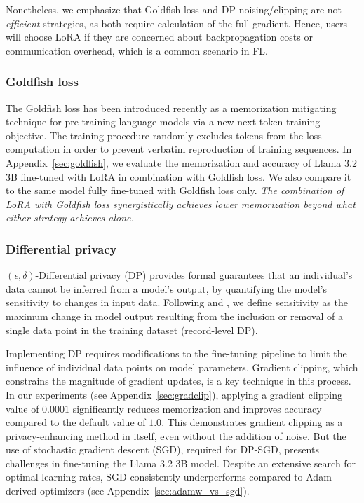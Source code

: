 Nonetheless, we emphasize that Goldfish loss and DP noising/clipping are not \textit{efficient} strategies, as both require calculation of the full gradient. Hence, users will choose LoRA if they are concerned about backpropagation costs or communication overhead, which is a common scenario in FL. 

\subsubsection{Goldfish loss}

The Goldfish loss \citep{hans2024goldfish} has been introduced recently as a memorization mitigating technique for pre-training language models via a new next-token training objective. The training procedure randomly excludes tokens from the loss computation in order to prevent verbatim reproduction of training sequences. In Appendix~\ref{sec:goldfish}, we evaluate the memorization and accuracy of Llama 3.2 3B fine-tuned with LoRA in combination with Goldfish loss. We also compare it to the same model fully fine-tuned with Goldfish loss only. \textit{The combination of LoRA with Goldfish loss synergistically achieves lower memorization beyond what either strategy achieves alone.}

\subsubsection{Differential privacy}
$(\epsilon, \delta)$-Differential privacy (DP) provides formal guarantees that an individual's data cannot be inferred from a model's output, by quantifying the model's sensitivity to changes in input data. Following \citet{li2021large} and \citet{liu2024differentially}, we define sensitivity as the maximum change in model output resulting from the inclusion or removal of a single data point in the training dataset (record-level DP).

Implementing DP requires modifications to the fine-tuning pipeline to limit the influence of individual data points on model parameters. Gradient clipping, which constrains the magnitude of gradient updates, is a key technique in this process. In our experiments (see Appendix~\ref{sec:gradclip}), applying a gradient clipping value of $0.0001$ significantly reduces memorization and improves accuracy compared to the default value of $1.0$. This demonstrates gradient clipping as a privacy-enhancing method in itself, even without the addition of noise. But the use of stochastic gradient descent (SGD), required for DP-SGD, presents challenges in fine-tuning the Llama 3.2 3B model. Despite an extensive search for optimal learning rates, SGD consistently underperforms compared to Adam-derived optimizers (see Appendix~\ref{sec:adamw_vs_sgd}).